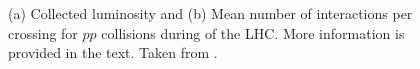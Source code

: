 \begin{figure}[t]
    \centering
    \hspace{-3.8em}
    \caption{(a) Collected luminosity and (b) Mean number of interactions per crossing for $pp$ collisions during \RunTwo of the LHC. More information is provided in the text. Taken from .}
    \label{fig:run-2-data-taking}
\end{figure}



